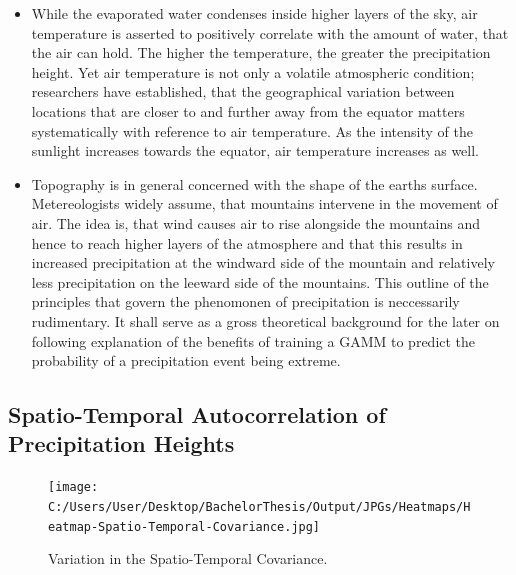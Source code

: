 \documentclass[
  12pt,
]{article}
\begin{document}
\begin{itemize}[label={}]
\item While the evaporated water condenses inside higher layers of the sky, air temperature is asserted to positively correlate with the amount of water, that the air can hold. The higher the temperature, the greater the precipitation height. Yet air temperature is not only a volatile atmospheric condition; researchers have established, that the geographical variation between locations that are closer to and further away from the equator matters systematically with reference to air temperature. As the intensity of the sunlight increases towards the equator, air temperature increases as well.
\item Topography is in general concerned with the shape of the earths surface. Metereologists widely assume, that mountains intervene in the movement of air. The idea is, that wind causes air to rise alongside the mountains and hence to reach higher layers of the atmosphere and that this results in increased precipitation at the windward side of the mountain and relatively less precipitation on the leeward side of the mountains. 
This outline of the principles that govern the phenomonen of precipitation is neccessarily rudimentary. 
It shall serve as a gross theoretical background for the later on following explanation of the benefits of training a GAMM to predict the probability of a precipitation event being extreme.
\end{itemize}

\hypertarget{spatio-temporal-autocorrelation-of-precipitation-heights}{%
\subsection{Spatio-Temporal Autocorrelation of Precipitation
Heights}\label{spatio-temporal-autocorrelation-of-precipitation-heights}}

\begin{figure}[htbp]
  \begingroup
  \centering
  \texttt{[image: C:/Users/User/Desktop/BachelorThesis/Output/JPGs/Heatmaps/Heatmap-Spatio-Temporal-Covariance.jpg]}
  \caption{Variation in the Spatio-Temporal Covariance.}
  \label{fig:heatmap}
  \endgroup
\end{figure}
\end{document}

